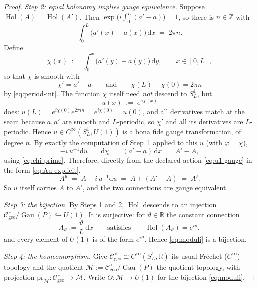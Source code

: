 \documentclass[11pt,a4paper]{article}
\theoremstyle{plain}
\theoremstyle{definition}
\theoremstyle{remark}
\newcommand{\Real}{\mathbb{R}}
\newcommand{\Int}{\mathbb{Z}}
\newcommand{\Cgeo}{\mathcal{C}_{\mathrm{geo}}}
\newcommand{\Gau}{\operatorname{Gau}}
\newcommand{\Hol}{\operatorname{Hol}}
\begin{document}
\begin{proof}
\emph{Step 2: equal holonomy implies gauge equivalence.}
Suppose $\Hol(A)=\Hol(A')$. Then $\exp\bigl(i\int_0^L(a'-a)\bigr)=1$, so there is $n\in\Int$ with
\begin{equation}
\label{eq:period-int}
\int_0^L\bigl(a'(x)-a(x)\bigr)\,\mathrm{d}x \;=\; 2\pi n .
\end{equation}
Define
\begin{equation}
\label{eq:chi}
\chi(x)\;:=\;\int_0^x\bigl(a'(y)-a(y)\bigr)\,\mathrm{d}y,
\qquad x\in[0,L],
\end{equation}
so that $\chi$ is smooth with
\begin{equation}
\label{eq:chi-prime}
\chi'=a'-a
\qquad\text{and}\qquad
\chi(L)-\chi(0)=2\pi n
\end{equation}
by \eqref{eq:period-int}. The function $\chi$ itself need \emph{not} descend to $S^1_L$, but
\begin{equation}
\label{eq:u-def}
u(x)\;:=\;e^{\,i\chi(x)}
\end{equation}
does: $u(L)=e^{i\chi(0)}e^{2\pi i n}=e^{i\chi(0)}=u(0)$, and all derivatives match at the seam
because $a,a'$ are smooth and $L$-periodic, so $\chi'$ and all its derivatives are $L$-periodic.
Hence $u\in C^\infty(S^1_L,U(1))$ is a bona fide gauge transformation, of degree $n$. By exactly
the computation of Step~1 applied to this $u$ (with $\varphi=\chi$),
\begin{equation}
\label{eq:u-mc}
-i\,u^{-1}\mathrm{d}u \;=\; \mathrm{d}\chi \;=\; (a'-a)\,\mathrm{d}x \;=\; A'-A ,
\end{equation}
using \eqref{eq:chi-prime}. Therefore, directly from the declared action \eqref{eq:u1-gauge} in the
form \eqref{eq:Au-explicit},
\[
A^{u}\;=\;A-i\,u^{-1}\mathrm{d}u\;=\;A+(A'-A)\;=\;A' .
\]
So $u$ itself carries $A$ to $A'$, and the two connections are gauge equivalent.

\emph{Step 3: the bijection.}
By Steps 1 and 2, $\Hol$ descends to an injection $\Cgeo^{\,\circ}/\Gau(P)\hookrightarrow U(1)$. It
is surjective: for $\vartheta\in\Real$ the constant connection
\begin{equation}
\label{eq:Atheta}
A_\vartheta:=\frac{\vartheta}{L}\,\mathrm{d}x
\qquad\text{satisfies}\qquad
\Hol(A_\vartheta)=e^{i\vartheta},
\end{equation}
and every element of $U(1)$ is of the form $e^{i\vartheta}$. Hence \eqref{eq:moduli} is a bijection.

\emph{Step 4: the homeomorphism.}
Give $\Cgeo^{\,\circ}\cong C^\infty(S^1_L,\Real)$ its usual Fr\'echet ($C^\infty$) topology and the
quotient $\mathcal{M}:=\Cgeo^{\,\circ}/\Gau(P)$ the quotient topology, with projection
$\mathrm{pr}_{\mathcal{M}}\colon\Cgeo^{\,\circ}\to\mathcal{M}$. Write
$\Theta\colon\mathcal{M}\to U(1)$ for the bijection \eqref{eq:moduli}.


\end{proof}
\end{document}
